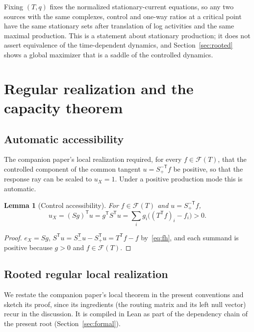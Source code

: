 \documentclass[11pt,a4paper]{article}
\theoremstyle{plain}
\newtheorem{lemma}[theorem]{Lemma}
\theoremstyle{definition}
\theoremstyle{remark}
\numberwithin{equation}{section}
\newcommand{\T}{\mathsf{T}}
\newcommand{\Sp}{S_{+}}
\newcommand{\Sm}{S_{-}}
\newcommand{\cone}{\mathcal{F}}
\begin{document}
Fixing $(T,q)$ fixes the normalized stationary-current equations, so any two sources with the same complexes, control and one-way ratios at a critical point have the same stationary sets after translation of log activities and the same maximal production. This is a statement about stationary production; it does not assert equivalence of the time-dependent dynamics, and Section~\ref{sec:rooted} shows a global maximizer that is a saddle of the controlled dynamics.

\section{Regular realization and the capacity theorem}\label{sec:capacity}

\subsection{Automatic accessibility}
The companion paper's local realization required, for every $f\in\cone(T)$, that the controlled component of the common tangent $u=\Sp^{-\T}f$ be positive, so that the response ray can be scaled to $u_X=1$. Under a positive production mode this is automatic.

\begin{lemma}[Control accessibility]\label{lem:access}
For $f\in\cone(T)$ and $u=\Sp^{-\T}f$,
\begin{equation}\label{eq:access}
 u_X=(Sg)^{\T}u=g^{\T}S^{\T}u=\sum_ig_i\big((T^{\T}f)_i-f_i\big)>0 .
\end{equation}
\end{lemma}
\begin{proof}
$e_X=Sg$, $S^{\T}u=\Sm^{\T}u-\Sp^{\T}u=T^{\T}f-f$ by~\eqref{eq:fh}, and each summand is positive because $g>0$ and $f\in\cone(T)$.
\end{proof}

\subsection{Rooted regular local realization}
We restate the companion paper's local theorem in the present conventions and sketch its proof, since its ingredients (the routing matrix and its left null vector) recur in the discussion. It is compiled in Lean as part of the dependency chain of the present root (Section~\ref{sec:formal}).
\end{document}
